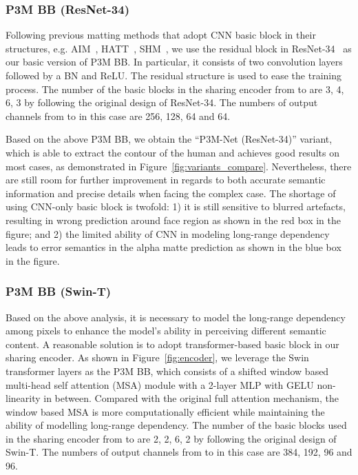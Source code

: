 \documentclass[twocolumn]{svjour3}
\begin{document}
\subsubsection{P3M BB (ResNet-34)}
Following previous matting methods that adopt CNN basic block in their structures, e.g. AIM~\citep{aim}, HATT~\citep{hatt}, SHM~\citep{shm}, we use the residual block in ResNet-34~\citep{he2016deep} as our basic version of P3M BB. In particular, it consists of two convolution layers followed by a BN and ReLU. The residual structure is used to ease the training process. The number of the basic blocks in the sharing encoder from  to  are 3, 4, 6, 3 by following the original design of ResNet-34. The numbers of output channels from  to  in this case are 256, 128, 64 and 64.

Based on the above P3M BB, we obtain the ``P3M-Net (ResNet-34)'' variant, which is able to extract the contour of the human and achieves good results on most cases, as demonstrated in Figure~\ref{fig:variants_compare}. Nevertheless, there are still room for further improvement in regards to both accurate semantic information and precise details when facing the complex case. The shortage of using CNN-only basic block is twofold: 1) it is still sensitive to blurred artefacts, resulting in wrong prediction around face region as shown in the red box in the figure; and 2) the limited ability of CNN in modeling long-range dependency leads to error semantics in the alpha matte prediction as shown in the blue box in the figure. 

\subsubsection{P3M BB (Swin-T)}

Based on the above analysis, it is necessary to model the long-range dependency among pixels to enhance the model's ability in perceiving different semantic content. A reasonable solution is to adopt transformer-based basic block in our sharing encoder. As shown in Figure~\ref{fig:encoder}, we leverage the Swin~\citep{swin} transformer layers as the P3M BB, which consists of a shifted window based multi-head self attention (MSA) module with a 2-layer MLP with GELU non-linearity in between. Compared with the original full attention mechanism, the window based MSA is more computationally efficient while maintaining the ability of modelling long-range dependency. The number of the basic blocks used in the sharing encoder from  to  are 2, 2, 6, 2 by following the original design of Swin-T. The numbers of output channels from  to  in this case are 384, 192, 96 and 96.
\end{document}
